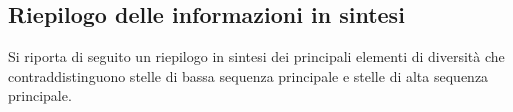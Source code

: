 \subsection{Riepilogo delle informazioni in sintesi}
Si riporta di seguito un riepilogo in sintesi dei principali elementi di diversit\`{a} che contraddistinguono stelle di bassa sequenza principale e stelle di alta sequenza principale. 
